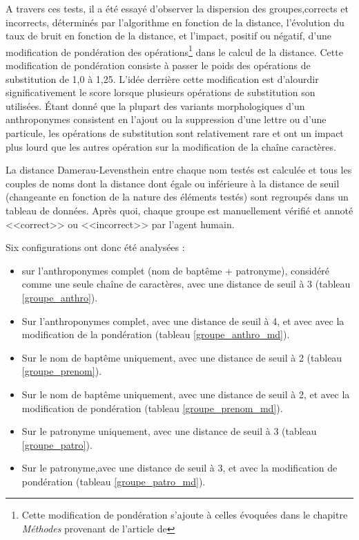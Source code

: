 A travers ces tests, il a été essayé d'observer la dispersion des groupes,corrects et incorrects, déterminés par l'algorithme en fonction de la distance, l'évolution du taux de bruit en fonction de la distance, et l'impact, positif ou négatif, d'une modification de pondération des opérations\footnote{Cette modification de pondération s'ajoute à celles évoquées dans le chapitre \textit{Méthodes} provenant de l'article de } dans le calcul de la distance.
Cette modification de pondération consiste à passer le poids des opérations de substitution de 1,0 à 1,25.
L'idée derrière cette modification est d'alourdir significativement le score lorsque plusieurs opérations de substitution son utilisées. 
Étant donné que la plupart des variants morphologiques d'un anthroponymes consistent en l'ajout ou la suppression d'une lettre ou d'une particule, les opérations de substitution sont relativement rare et ont un impact plus lourd que les autres opération sur la modification de la chaîne caractères.

La distance Damerau-Levensthein entre chaque nom testés est calculée et tous les couples de noms dont la distance dont égale ou inférieure à la distance de seuil (changeante en fonction de la nature des éléments testés) sont regroupés dans un tableau de données. Après quoi, chaque groupe est manuellement vérifié et annoté <<correct>> ou <<incorrect>> par l'agent humain.

Six configurations ont donc été analysées :
\begin{itemize}
    \item sur l'anthroponymes complet (nom de baptême + patronyme), considéré comme une seule chaîne de caractères, avec une distance de seuil à 3 (tableau \ref{groupe_anthro}).
    \item Sur l'anthroponymes complet, avec une distance de seuil à 4, et avec avec la modification de la pondération (tableau \ref{groupe_anthro_md}).
    \item Sur le nom de baptême uniquement, avec une distance de seuil à 2 (tableau \ref{groupe_prenom}).
    \item Sur le nom de baptême uniquement, avec une distance de seuil à 2, et avec la modification de pondération (tableau \ref{groupe_prenom_md}).
    \item Sur le patronyme uniquement, avec une distance de seuil à 3 (tableau \ref{groupe_patro}).
    \item Sur le patronyme,avec une distance de seuil à 3, et avec la modification de pondération (tableau \ref{groupe_patro_md}).
\end{itemize}
\vspace{0,5cm}

